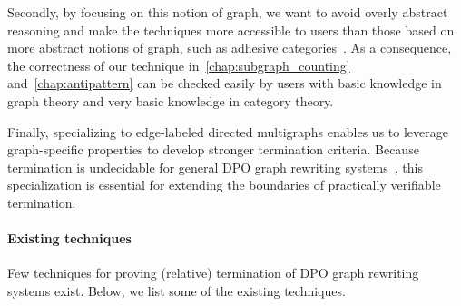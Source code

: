  Secondly, by focusing on this notion of graph, we want to avoid overly abstract reasoning and make the techniques more accessible to users than those based on more abstract notions of graph, such as adhesive categories~\cite{lack2004adhesive}.
 As a consequence, the correctness of our technique in~\ref{chap:subgraph_counting} and~\ref{chap:antipattern} can be checked easily by users with basic knowledge in graph theory and very basic knowledge in category theory.

Finally, specializing to edge-labeled directed multigraphs enables us to leverage graph-specific properties to develop stronger termination criteria. Because termination is undecidable for general DPO graph rewriting systems~\cite{plump1998terminationundecidable}, this specialization is essential for extending the boundaries of practically verifiable termination. 

\paragraph{Existing techniques}
Few techniques for proving (relative) termination of DPO graph rewriting systems exist. Below, we list some of the existing techniques.

